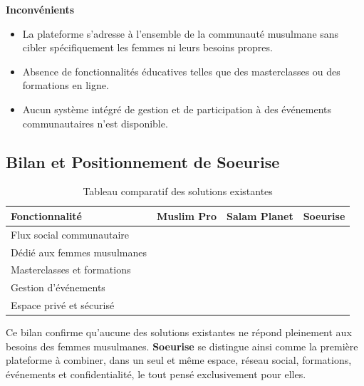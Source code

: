 \documentclass[12pt,a4paper]{report}
\begin{document}
	\textbf{Inconvénients}
	\begin{itemize}
		\item La plateforme s'adresse à l'ensemble de la communauté musulmane sans 
		cibler spécifiquement les femmes ni leurs besoins propres.
		\item Absence de fonctionnalités éducatives telles que des masterclasses 
		ou des formations en ligne.
		\item Aucun système intégré de gestion et de participation à des événements 
		communautaires n'est disponible.
	\end{itemize}
	
	\subsection{Bilan et Positionnement de Soeurise}
	
	\begin{table}[H]
		\centering
		\renewcommand{\arraystretch}{1.4}
		\begin{tabular}{|l|c|c|c|}
			\hline
			\textbf{Fonctionnalité} & \textbf{Muslim Pro} & \textbf{Salam Planet} & \textbf{Soeurise} \\
			\hline
			Flux social communautaire & \textcolor{red}{\texttimes} & \textcolor{green}{\checkmark} & \textcolor{green}{\checkmark} \\
			\hline
			Dédié aux femmes musulmanes & \textcolor{red}{\texttimes} & \textcolor{red}{\texttimes} & \textcolor{green}{\checkmark} \\
			\hline
			Masterclasses et formations & \textcolor{red}{\texttimes} & \textcolor{red}{\texttimes} & \textcolor{green}{\checkmark} \\
			\hline
			Gestion d'événements & \textcolor{red}{\texttimes} & \textcolor{red}{\texttimes} & \textcolor{green}{\checkmark} \\
			\hline
			Espace privé et sécurisé & \textcolor{red}{\texttimes} & \textcolor{red}{\texttimes} & \textcolor{green}{\checkmark} \\
			\hline
		\end{tabular}
		\caption{Tableau comparatif des solutions existantes}
		\label{tab:comparatif}
	\end{table}
	
	\medskip
	
	Ce bilan confirme qu'aucune des solutions existantes ne répond pleinement aux besoins 
	des femmes musulmanes. \textbf{Soeurise} se distingue ainsi comme la première plateforme 
	à combiner, dans un seul et même espace, réseau social, formations, événements et 
	confidentialité, le tout pensé exclusivement pour elles.
\end{document}
